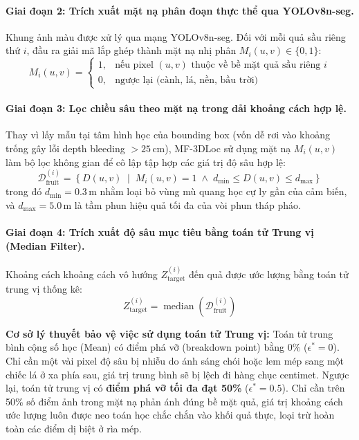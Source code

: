\documentclass[12pt,a4paper]{article}
\begin{document}
\paragraph{Giai đoạn 2: Trích xuất mặt nạ phân đoạn thực thể qua YOLOv8n-seg.}
Khung ảnh màu được xử lý qua mạng YOLOv8n-seg. Đối với mỗi quả sầu riêng thứ $i$, đầu ra giải mã lắp ghép thành mặt nạ nhị phân $M_i(u, v) \in \{0, 1\}$:
\begin{equation}
M_i(u, v) = \begin{cases} 1, & \text{nếu pixel } (u, v) \text{ thuộc về bề mặt quả sầu riêng } i \\ 0, & \text{ngược lại (cành, lá, nền, bầu trời)} \end{cases}
\end{equation}

\paragraph{Giai đoạn 3: Lọc chiều sâu theo mặt nạ trong dải khoảng cách hợp lệ.}
Thay vì lấy mẫu tại tâm hình học của bounding box (vốn dễ rơi vào khoảng trống gây lỗi depth bleeding $>25\,\text{cm}$), MF-3DLoc sử dụng mặt nạ $M_i(u, v)$ làm bộ lọc không gian để cô lập tập hợp các giá trị độ sâu hợp lệ:
\begin{equation}
\mathcal{D}_{\text{fruit}}^{(i)} = \left\{ D(u, v) \;\middle|\; M_i(u, v) = 1 \;\land\; d_{\min} \le D(u, v) \le d_{\max} \right\}
\end{equation}
trong đó $d_{\min} = 0.3\,\text{m}$ nhằm loại bỏ vùng mù quang học cự ly gần của cảm biến, và $d_{\max} = 5.0\,\text{m}$ là tầm phun hiệu quả tối đa của vòi phun tháp pháo.

\paragraph{Giai đoạn 4: Trích xuất độ sâu mục tiêu bằng toán tử Trung vị (Median Filter).}
Khoảng cách khoảng cách vô hướng $Z_{\text{target}}^{(i)}$ đến quả được ước lượng bằng toán tử trung vị thống kê:
\begin{equation}
Z_{\text{target}}^{(i)} = \operatorname{median}\left(\mathcal{D}_{\text{fruit}}^{(i)}\right)
\label{eq:depth_median}
\end{equation}

\noindent\textbf{Cơ sở lý thuyết bảo vệ việc sử dụng toán tử Trung vị:}
Toán tử trung bình cộng số học (Mean) có điểm phá vỡ (breakdown point) bằng $0\%$ ($\epsilon^* = 0$). Chỉ cần một vài pixel độ sâu bị nhiễu do ánh sáng chói hoặc lem mép sang một chiếc lá ở xa phía sau, giá trị trung bình sẽ bị lệch đi hàng chục centimet. Ngược lại, toán tử trung vị có \textbf{điểm phá vỡ tối đa đạt 50\%} ($\epsilon^* = 0.5$). Chỉ cần trên 50\% số điểm ảnh trong mặt nạ phản ánh đúng bề mặt quả, giá trị khoảng cách ước lượng luôn được neo toán học chắc chắn vào khối quả thực, loại trừ hoàn toàn các điểm dị biệt ở rìa mép.
\end{document}
